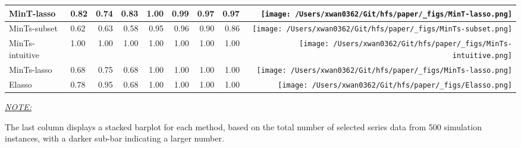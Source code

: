 \documentclass[11pt,a4paper,]{article}
\begin{document}
\begin{table}[!h]
{\begin{threeparttable}
\begin{tabular}{llrrrrrr>{}r}
MinT-lasso & 0.82 & 0.74 & 0.83 & 1.00 & 0.99 & 0.97 & 0.97 & \texttt{[image: /Users/xwan0362/Git/hfs/paper/\_figs/MinT-lasso.png]}\\
\midrule
MinTs-subset & 0.62 & 0.63 & 0.58 & 0.95 & 0.96 & 0.90 & 0.86 & \texttt{[image: /Users/xwan0362/Git/hfs/paper/\_figs/MinTs-subset.png]}\\
MinTs-intuitive & 1.00 & 1.00 & 1.00 & 1.00 & 1.00 & 1.00 & 1.00 & \texttt{[image: /Users/xwan0362/Git/hfs/paper/\_figs/MinTs-intuitive.png]}\\
MinTs-lasso & 0.68 & 0.75 & 0.68 & 1.00 & 1.00 & 1.00 & 1.00 & \texttt{[image: /Users/xwan0362/Git/hfs/paper/\_figs/MinTs-lasso.png]}\\
\midrule
Elasso & 0.78 & 0.95 & 0.68 & 1.00 & 1.00 & 1.00 & 1.00 & \texttt{[image: /Users/xwan0362/Git/hfs/paper/\_figs/Elasso.png]}\\
\bottomrule
\end{tabular}
\begin{tablenotes}[para]
\item \underline{\textit{NOTE:}} 
\item The last column displays a stacked barplot for each method, based on the total number of selected series data from 500 simulation instances, with a darker sub-bar indicating a larger number.
\end{tablenotes}
\end{threeparttable}}
\endgroup{}
\end{table}
\end{document}
